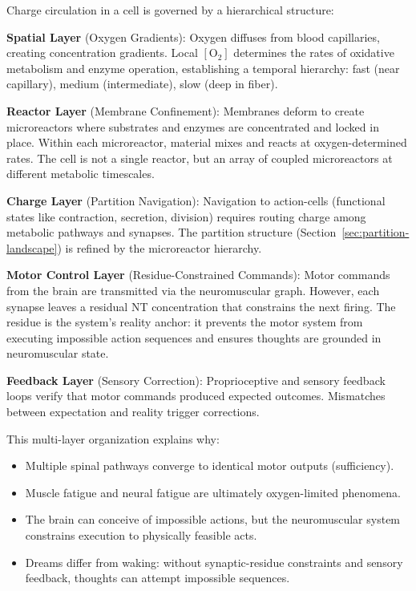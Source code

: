 \begin{principle}
Charge circulation in a cell is governed by a hierarchical structure:

\textbf{Spatial Layer} (Oxygen Gradients): Oxygen diffuses from blood capillaries, creating concentration gradients. Local $[\text{O}_2]$ determines the rates of oxidative metabolism and enzyme operation, establishing a temporal hierarchy: fast (near capillary), medium (intermediate), slow (deep in fiber).

\textbf{Reactor Layer} (Membrane Confinement): Membranes deform to create microreactors where substrates and enzymes are concentrated and locked in place. Within each microreactor, material mixes and reacts at oxygen-determined rates. The cell is not a single reactor, but an array of coupled microreactors at different metabolic timescales.

\textbf{Charge Layer} (Partition Navigation): Navigation to action-cells (functional states like contraction, secretion, division) requires routing charge among metabolic pathways and synapses. The partition structure (Section~\ref{sec:partition-landscape}) is refined by the microreactor hierarchy.

\textbf{Motor Control Layer} (Residue-Constrained Commands): Motor commands from the brain are transmitted via the neuromuscular graph. However, each synapse leaves a residual NT concentration that constrains the next firing. The residue is the system's reality anchor: it prevents the motor system from executing impossible action sequences and ensures thoughts are grounded in neuromuscular state.

\textbf{Feedback Layer} (Sensory Correction): Proprioceptive and sensory feedback loops verify that motor commands produced expected outcomes. Mismatches between expectation and reality trigger corrections.

This multi-layer organization explains why:
\begin{itemize}[noitemsep]
\item Multiple spinal pathways converge to identical motor outputs (sufficiency).
\item Muscle fatigue and neural fatigue are ultimately oxygen-limited phenomena.
\item The brain can conceive of impossible actions, but the neuromuscular system constrains execution to physically feasible acts.
\item Dreams differ from waking: without synaptic-residue constraints and sensory feedback, thoughts can attempt impossible sequences.
\end{itemize}
\end{principle}


